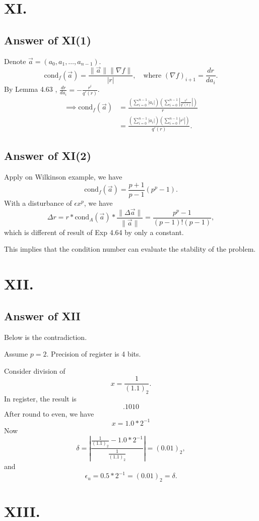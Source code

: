 \documentclass[a4paper]{article}
\begin{document}
\section*{XI.}

\subsection*{Answer of XI(1)}
Denote $\vec{a}=(a_0,a_1,\ldots,a_{n-1})$.
$$\text{cond}_f(\vec{a})=\frac{\|\vec{a}\|\|\nabla f\|}{|r|},\quad \text{where } (\nabla f)_{i+1}=\frac{dr}{da_i}.$$
By Lemma 4.63 \cite{Lemma4_63}, $\frac{dr}{da_i}=-\frac{r^i}{q'(r)}$.
\begin{align*}
    \implies \text{cond}_f(\vec{a})&=\frac{(\sum_{i=0}^{n-1}|a_i|)(\sum_{i=0}^{n-1}|\frac{r^i}{q'(r)}|)}{r}\\
    &=\frac{(\sum_{i=0}^{n-1}|a_i|)(\sum_{i=0}^{n-1}|r^i|)}{q'(r)}.
\end{align*}

\subsection*{Answer of XI(2)}
Apply on Wilkinson example, we have
$$\text{cond}_f(\vec{a})=\frac{p+1}{p-1}(p^p-1).$$
With a disturbance of $\epsilon x^p$, we have
$$\Delta r=r*\text{cond}_A(\vec{a})*\frac{\|\Delta \vec{a}\|}{\|\vec{a}\|}=\frac{p^p-1}{(p-1)!(p-1)},$$
which is different of result of Exp 4.64 \cite{Exp4_64} by only a constant.

This implies that the condition number can evaluate the stability of the problem.

\section*{XII.}

\subsection*{Answer of XII}
Below is the contradiction.

Assume $p=2$. Precision of register is 4 bits.

Consider division of $$x=\frac{1}{(1.1)_2}.$$
In register, the result is $$.1010$$ After round to even, we have $$x=1.0*2^{-1}$$
Now $$\delta=|\frac{\frac{1}{(1.1)_2}-1.0*2^{-1}}{\frac{1}{(1.1)_2}}|=(0.01)_2,$$
and $$\epsilon_u=0.5*2^{-1}=(0.01)_2=\delta.$$

\section*{XIII.}
\end{document}
